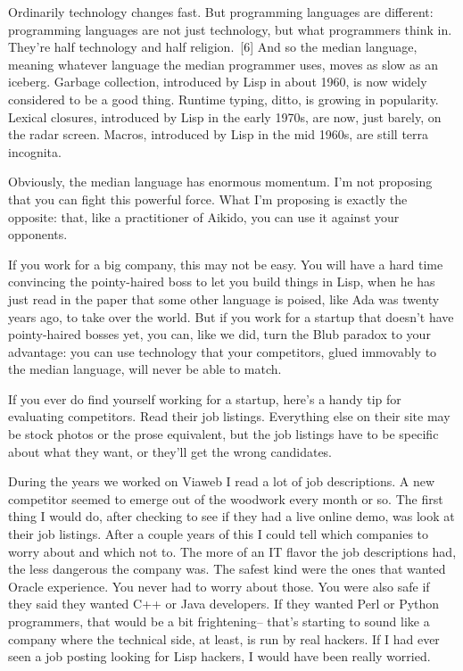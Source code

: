 \documentclass[10pt,twoside,openright]{memoir}
\begin{document}
Ordinarily technology changes fast. But programming languages are different: programming languages are not just technology, but what programmers think in. They're half technology and half religion.~[6] And so the median language, meaning whatever language the median programmer uses, moves as slow as an iceberg. Garbage collection, introduced by Lisp in about 1960, is now widely considered to be a good thing. Runtime typing, ditto, is growing in popularity. Lexical closures, introduced by Lisp in the early 1970s, are now, just barely, on the radar screen. Macros, introduced by Lisp in the mid 1960s, are still terra incognita.

Obviously, the median language has enormous momentum. I'm not proposing that you can fight this powerful force. What I'm proposing is exactly the opposite: that, like a practitioner of Aikido, you can use it against your opponents.

If you work for a big company, this may not be easy. You will have a hard time convincing the pointy-haired boss to let you build things in Lisp, when he has just read in the paper that some other language is poised, like Ada was twenty years ago, to take over the world. But if you work for a startup that doesn't have pointy-haired bosses yet, you can, like we did, turn the Blub paradox to your advantage: you can use technology that your competitors, glued immovably to the median language, will never be able to match.

If you ever do find yourself working for a startup, here's a handy tip for evaluating competitors. Read their job listings. Everything else on their site may be stock photos or the prose equivalent, but the job listings have to be specific about what they want, or they'll get the wrong candidates.

During the years we worked on Viaweb I read a lot of job descriptions. A new competitor seemed to emerge out of the woodwork every month or so. The first thing I would do, after checking to see if they had a live online demo, was look at their job listings. After a couple years of this I could tell which companies to worry about and which not to. The more of an IT flavor the job descriptions had, the less dangerous the company was. The safest kind were the ones that wanted Oracle experience. You never had to worry about those. You were also safe if they said they wanted C++ or Java developers. If they wanted Perl or Python programmers, that would be a bit frightening-- that's starting to sound like a company where the technical side, at least, is run by real hackers. If I had ever seen a job posting looking for Lisp hackers, I would have been really worried.
\end{document}
